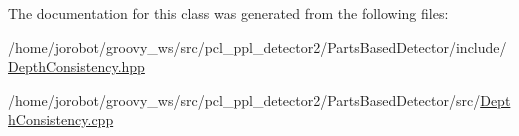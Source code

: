 \-The documentation for this class was generated from the following files\-:\begin{DoxyCompactItemize}
\item 
/home/jorobot/groovy\-\_\-ws/src/pcl\-\_\-ppl\-\_\-detector2/\-Parts\-Based\-Detector/include/\hyperlink{DepthConsistency_8hpp}{\-Depth\-Consistency.\-hpp}\item 
/home/jorobot/groovy\-\_\-ws/src/pcl\-\_\-ppl\-\_\-detector2/\-Parts\-Based\-Detector/src/\hyperlink{DepthConsistency_8cpp}{\-Depth\-Consistency.\-cpp}\end{DoxyCompactItemize}
